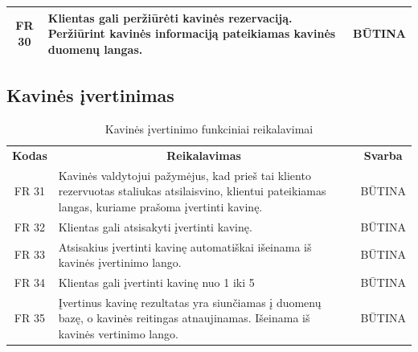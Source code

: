 \documentclass{VUMIFPSkursinis}
\begin{document}
{{{{{\begin{center}
\begin{table}[H]
\begin{tabular}{|p{2cm}|p{}|p{}|}
		\multicolumn{1}{|c|}{FR 30}&
		{Klientas gali peržiūrėti kavinės rezervaciją. Peržiūrint kavinės informaciją pateikiamas kavinės duomenų langas.}&
		\multicolumn{1}{|c|}{BŪTINA}\\				
	\hline		
	
	\end{tabular}		
	
	\label{tabel:RezervacijosPeržiūra}
	\end{table}


\end{center}



\subsection{Kavinės įvertinimas}
\begin{center}
	\begin{table}[H]
	\caption{Kavinės įvertinimo funkciniai reikalavimai}
	\begin{tabular}{|p{2cm}|p{}|p{}|}
	
	\hline
	    \rowcolor{lightgray}
		\multicolumn{3}{|c|}{Kavinės įvertinimas}\\
		
	\hline
		\multicolumn{1}{|c|}{{\bfseries Kodas}}&
		\multicolumn{1}{|c|}{{\bfseries Reikalavimas}}&
		\multicolumn{1}{|c|}{{\bfseries Svarba}}\\

	\hline
	
		\multicolumn{1}{|c|}{FR 31}&
		{Kavinės valdytojui pažymėjus, kad prieš tai kliento rezervuotas staliukas atsilaisvino, klientui pateikiamas langas, kuriame prašoma įvertinti kavinę.}&
		\multicolumn{1}{|c|}{BŪTINA}\\				
	\hline
	
		\multicolumn{1}{|c|}{FR 32}&
		{Klientas gali atsisakyti įvertinti kavinę.}&
		\multicolumn{1}{|c|}{BŪTINA}\\				
	\hline
	
		\multicolumn{1}{|c|}{FR 33}&
		{Atsisakius įvertinti kavinę automatiškai išeinama iš kavinės įvertinimo lango.}&
		\multicolumn{1}{|c|}{BŪTINA}\\				
	\hline
	
		\multicolumn{1}{|c|}{FR 34}&
		{Klientas gali įvertinti kavinę nuo 1 iki 5}&
		\multicolumn{1}{|c|}{BŪTINA}\\				
	\hline
	
		\multicolumn{1}{|c|}{FR 35}&
		{Įvertinus kavinę rezultatas yra siunčiamas į duomenų bazę, o kavinės reitingas atnaujinamas. Išeinama iš kavinės vertinimo lango.}&
		\multicolumn{1}{|c|}{BŪTINA}\\				
	\hline	
	

\end{tabular}
\end{table}
\end{center}}}}}}
\end{document}
